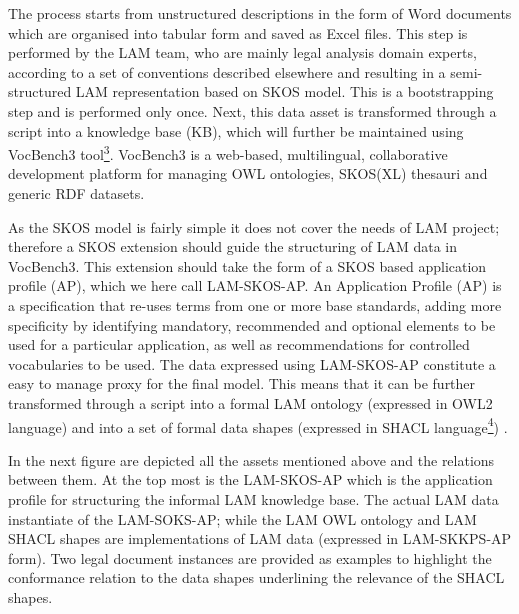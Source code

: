 The process starts from unstructured descriptions in the form of Word
documents which are organised into tabular form and saved as Excel
files. This step is performed by the LAM team, who are mainly legal
analysis domain experts, according to a set of conventions described
elsewhere and resulting in a semi-structured LAM representation based on
SKOS model. This is a bootstrapping step and is performed only once.
Next, this data asset is transformed through a script into a knowledge
base (KB), which will further be maintained using VocBench3
tool\protect\hyperlink{fntarg_3}{\textsuperscript{3}}. VocBench3 is a
web-based, multilingual, collaborative development platform for managing
OWL ontologies, SKOS(XL) thesauri and generic RDF datasets.

As the SKOS model is fairly simple it does not cover the needs of LAM
project; therefore a SKOS extension should guide the structuring of LAM
data in VocBench3. This extension should take the form of a SKOS based
application profile (AP), which we here call LAM-SKOS-AP. An Application
Profile (AP) is a specification that re-uses terms from one or more base
standards, adding more specificity by identifying mandatory, recommended
and optional elements to be used for a particular application, as well
as recommendations for controlled vocabularies to be used. The data
expressed using LAM-SKOS-AP constitute a easy to manage proxy for the
final model. This means that it can be further transformed through a
script into a formal LAM ontology (expressed in OWL2 language) and into
a set of formal data shapes (expressed in SHACL
language\protect\hyperlink{fntarg_4}{\textsuperscript{4}}) .

In the next figure are depicted all the assets mentioned above and the
relations between them. At the top most is the LAM-SKOS-AP which is the
application profile for structuring the informal LAM knowledge base. The
actual LAM data instantiate of the LAM-SOKS-AP; while the LAM OWL
ontology and LAM SHACL shapes are implementations of LAM data (expressed
in LAM-SKKPS-AP form). Two legal document instances are provided as
examples to highlight the conformance relation to the data shapes
underlining the relevance of the SHACL shapes.


